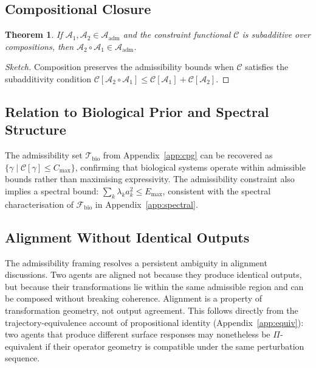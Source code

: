 \documentclass[12pt, a4paper]{article}
\newtheorem{theorem}{Theorem}[section]
\theoremstyle{remark}
\theoremstyle{definition}
\begin{document}
\subsection{Compositional Closure}

\begin{theorem}
If $\mathcal{A}_1, \mathcal{A}_2 \in \mathcal{A}_{\mathrm{adm}}$ and the constraint
functional $\mathcal{C}$ is subadditive over compositions, then
$\mathcal{A}_2 \circ \mathcal{A}_1 \in \mathcal{A}_{\mathrm{adm}}$.
\end{theorem}

\begin{proof}[Sketch]
Composition preserves the admissibility bounds when $\mathcal{C}$ satisfies the
subadditivity condition $\mathcal{C}[\mathcal{A}_2 \circ \mathcal{A}_1] \le
\mathcal{C}[\mathcal{A}_1] + \mathcal{C}[\mathcal{A}_2]$.
\end{proof}

\subsection{Relation to Biological Prior and Spectral Structure}

The admissibility set $\mathcal{T}_{\mathrm{bio}}$ from Appendix~\ref{app:cpg} can be
recovered as $\{\gamma \mid \mathcal{C}[\gamma] \le C_{\max}\}$, confirming that biological
systems operate within admissible bounds rather than maximising expressivity.  The
admissibility constraint also implies a spectral bound: $\sum_k \lambda_k a_k^2 \le E_{\max}$,
consistent with the spectral characterisation of $\mathcal{F}_{\mathrm{bio}}$ in
Appendix~\ref{app:spectral}.

\subsection{Alignment Without Identical Outputs}

The admissibility framing resolves a persistent ambiguity in alignment discussions.  Two
agents are aligned not because they produce identical outputs, but because their
transformations lie within the same admissible region and can be composed without breaking
coherence.  Alignment is a property of transformation geometry, not output agreement.  This
follows directly from the trajectory-equivalence account of propositional identity
(Appendix~\ref{app:equiv}): two agents that produce different surface responses may
nonetheless be $\Pi$-equivalent if their operator geometry is compatible under the same
perturbation sequence.
\end{document}
